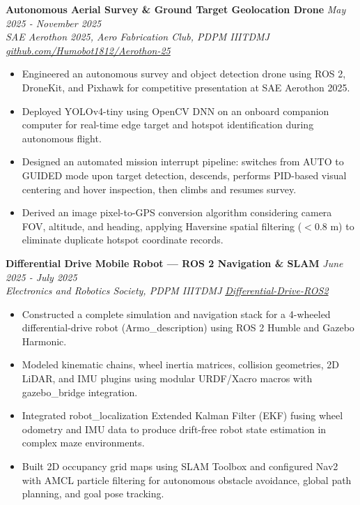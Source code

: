 \documentclass[10pt,a4paper]{article}
\begin{document}
\vspace{3pt}
\textbf{Autonomous Aerial Survey \& Ground Target Geolocation Drone} \hfill \textit{May 2025 - November 2025}\\
\textit{SAE Aerothon 2025, Aero Fabrication Club, PDPM IIITDMJ} \hfill \textit{\href{https://github.com/Humobot1812/Aerothon-25}{github.com/Humobot1812/Aerothon-25}}
\begin{itemize}[leftmargin=1.2rem,itemsep=1.5pt,topsep=2pt,parsep=0pt]
  \item Engineered an autonomous survey and object detection drone using ROS 2, DroneKit, and Pixhawk for competitive presentation at SAE Aerothon 2025.
  \item Deployed YOLOv4-tiny using OpenCV DNN on an onboard companion computer for real-time edge target and hotspot identification during autonomous flight.
  \item Designed an automated mission interrupt pipeline: switches from AUTO to GUIDED mode upon target detection, descends, performs PID-based visual centering and hover inspection, then climbs and resumes survey.
  \item Derived an image pixel-to-GPS conversion algorithm considering camera FOV, altitude, and heading, applying Haversine spatial filtering ($<$0.8 m) to eliminate duplicate hotspot coordinate records.
\end{itemize}

\vspace{3pt}
\textbf{Differential Drive Mobile Robot — ROS 2 Navigation \& SLAM} \hfill \textit{June 2025 - July 2025}\\
\textit{Electronics and Robotics Society, PDPM IIITDMJ} \hfill \textit{\href{https://github.com/Humobot1812/Differential-Drive-ROS2-Navigation-Project}{Differential-Drive-ROS2}}
\begin{itemize}[leftmargin=1.2rem,itemsep=1.5pt,topsep=2pt,parsep=0pt]
  \item Constructed a complete simulation and navigation stack for a 4-wheeled differential-drive robot (Armo\_description) using ROS 2 Humble and Gazebo Harmonic.
  \item Modeled kinematic chains, wheel inertia matrices, collision geometries, 2D LiDAR, and IMU plugins using modular URDF/Xacro macros with gazebo\_bridge integration.
  \item Integrated robot\_localization Extended Kalman Filter (EKF) fusing wheel odometry and IMU data to produce drift-free robot state estimation in complex maze environments.
  \item Built 2D occupancy grid maps using SLAM Toolbox and configured Nav2 with AMCL particle filtering for autonomous obstacle avoidance, global path planning, and goal pose tracking.
\end{itemize}
\end{document}
